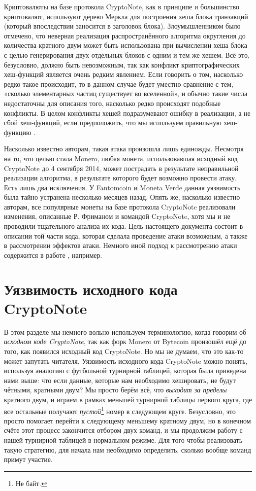 \documentclass{mrl}
\begin{document}
Криптовалюты на базе протокола CryptoNote, как в принципе и большинство криптовалют, используют дерево Меркла для построения хеша блока транзакций (который впоследствии заносится в заголовок блока). Злоумышленником было отмечено, что неверная реализация распространённого алгоритма округления до количества кратного двум может быть использована при вычислении хеша блока с целью генерирования двух отдельных блоков с одним и тем же хешем. Всё это, безусловно, должно быть невозможным, так как конфликт криптографических хеш-функций является очень редким явлением. Если говорить о том, насколько редко такое происходит, то в данном случае будет уместно сравнение с тем, «сколько элементарных частиц существует во вселенной», и обычно такие числа недостаточны для описания того, насколько редко происходят подобные конфликты. В целом конфликты хешей подразумевают ошибку в реализации, а не сбой хеш-функций, если предположить, что мы используем правильную хеш-функцию \cite{anderson1993classification}.

Насколько известно авторам, такая атака произошла лишь единожды. Несмотря на то, что целью стала Monero, любая монета, использовавшая исходный код CryptoNote до 4 сентября 2014, может пострадать в результате неправильной реализации алгоритма, в результате которого будет возможно провести атаку. Есть лишь два исключения. У Fantomcoin и Moneta Verde данная уязвимость была тайно устранена несколько месяцев назад. Опять же, насколько известно авторам, все популярные монеты на базе протокола CryptoNote реализовали изменения, описанные Р. Фриманом и командой CryptoNote, хотя мы и не проводили тщательного анализа их кода. Цель настоящего документа состоит в описании той части кода, которая сделала проведение атаки возможным, а также в рассмотрении эффектов атаки. Немного иной подход к рассмотрению атаки содержится в работе  \cite{CryptoNote:2014}, например.

\section{Уязвимость исходного кода CryptoNote}
В этом разделе мы немного вольно используем терминологию, когда говорим об \emph{исходном коде \linebreak CryptoNote}, так как форк Monero от Bytecoin произошёл ещё до того, как появился исходный код CryptoNote. Но мы не думаем, что это как-то может запутать читателя. Уязвимость исходного кода CryptoNote можно понять, используя аналогию с футбольной турнирной таблицей, которая была приведена нами выше: что если данные, которые нам необходимо хешировать, не будут чётными, кратными двум? Мы просто берём всё, что \emph{выходит за пределы} кратного двум, и играем в рамках меньшей турнирной таблицы первого круга, где все остальные получают \emph{пустой}\footnote{Не байт.} номер в следующем круге. Безусловно, это просто помогает перейти к следующему меньшему кратному двум, но в конечном счёте этот процесс закончится отбором двух команд, и мы продолжим работу с нашей турнирной таблицей в нормальном режиме. Для того чтобы реализовать такую стратегию, для начала нам необходимо определить, сколько вообще команд примут участие.
\end{document}
